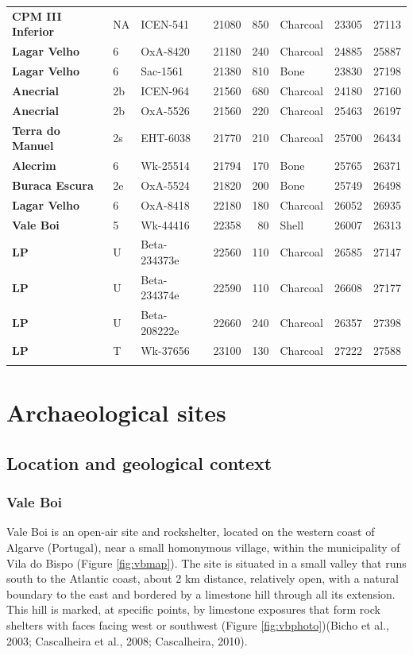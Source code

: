 \documentclass[12pt,twoside]{reedthesis}
\begin{document}
\begin{landscape}
\begin{longtable}[t]{>{\bfseries}lllrrlrr}
CPM III Inferior & NA & ICEN-541 & 21080 & 850 & Charcoal & 23305 & 27113\\
Lagar Velho & 6 & OxA-8420 & 21180 & 240 & Charcoal & 24885 & 25887\\
Lagar Velho & 6 & Sac-1561 & 21380 & 810 & Bone & 23830 & 27198\\
\addlinespace
Anecrial & 2b & ICEN-964 & 21560 & 680 & Charcoal & 24180 & 27160\\
Anecrial & 2b & OxA-5526 & 21560 & 220 & Charcoal & 25463 & 26197\\
Terra do Manuel & 2s & EHT-6038 & 21770 & 210 & Charcoal & 25700 & 26434\\
Alecrim & 6 & Wk-25514 & 21794 & 170 & Bone & 25765 & 26371\\
Buraca Escura & 2e & OxA-5524 & 21820 & 200 & Bone & 25749 & 26498\\
\addlinespace
Lagar Velho & 6 & OxA-8418 & 22180 & 180 & Charcoal & 26052 & 26935\\
Vale Boi & 5 & Wk-44416 & 22358 & 80 & Shell & 26007 & 26313\\
LP & U & Beta-234373e & 22560 & 110 & Charcoal & 26585 & 27147\\
LP & U & Beta-234374e & 22590 & 110 & Charcoal & 26608 & 27177\\
LP & U & Beta-208222e & 22660 & 240 & Charcoal & 26357 & 27398\\
\addlinespace
LP & T & Wk-37656 & 23100 & 130 & Charcoal & 27222 & 27588\\*
\end{longtable}
\endgroup{}
\end{landscape}
\hypertarget{archaeological-sites}{%
\chapter{Archaeological sites}\label{archaeological-sites}}

\hypertarget{location-and-geological-context}{%
\section{Location and geological context}\label{location-and-geological-context}}

\hypertarget{vale-boi}{%
\subsection{Vale Boi}\label{vale-boi}}

Vale Boi is an open-air site and rockshelter, located on the western coast of Algarve (Portugal), near a small homonymous village, within the municipality of Vila do Bispo (Figure \ref{fig:vbmap}). The site is situated in a small valley that runs south to the Atlantic coast, about 2 km distance, relatively open, with a natural boundary to the east and bordered by a limestone hill through all its extension. This hill is marked, at specific points, by limestone exposures that form rock shelters with faces facing west or southwest (Figure \ref{fig:vbphoto})(Bicho et al., 2003; Cascalheira et al., 2008; Cascalheira, 2010).
\end{document}
